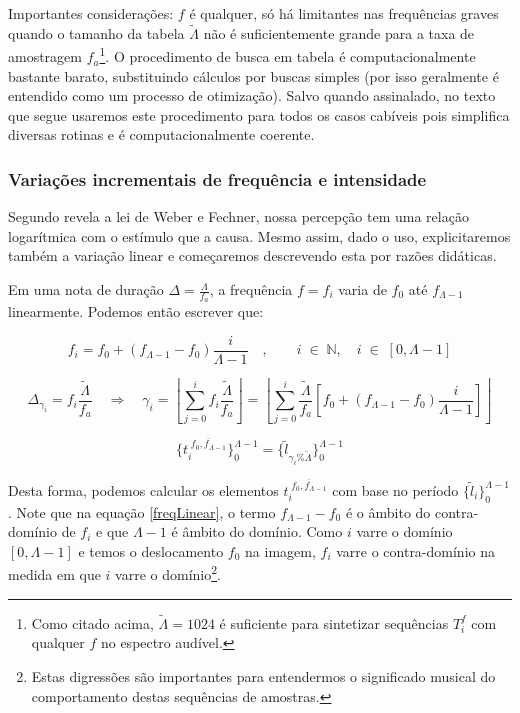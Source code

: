 Importantes considerações: $f$ é qualquer, só há limitantes nas frequências
graves quando o tamanho da tabela $\widetilde{\Lambda}$ não é suficientemente grande para a taxa de amostragem
$f_a$\footnote{Como citado acima, $\widetilde{\Lambda} = 1024$ é suficiente para sintetizar
sequências $T_i^f$ com qualquer $f$ no espectro audível.}. O procedimento de busca em tabela
é computacionalmente bastante barato, substituindo cálculos por buscas simples (por isso geralmente
é entendido como um processo de otimização). Salvo quando assinalado,
no texto que segue usaremos este procedimento para todos os casos cabíveis pois
simplifica diversas rotinas e é computacionalmente coerente.


\subsubsection{Variações incrementais de frequência e intensidade}

Segundo revela a lei de Weber e Fechner, nossa percepção tem uma relação logarítmica com
o estímulo que a causa. Mesmo assim, dado o uso, explicitaremos também a variação
linear e começaremos descrevendo esta por razões didáticas.

Em uma nota de duração $\Delta = \frac{\Lambda}{f_a}$, a frequência $f=f_i$ varia de $f_0$ até $f_{\Lambda -1}$
linearmente. Podemos então escrever que:

\begin{equation}\label{freqLinear}
f_i=f_0 + (f_{\Lambda-1}-f_0)\frac{i}{\Lambda-1} \quad ,\quad \quad i \;\in\; \mathbb{N}, \quad i \;\in\; [0,\Lambda-1]
\end{equation}

\begin{equation}\label{indiceLinear}
\Delta_{\gamma_i}=f_i\frac{\widetilde{\Lambda}}{f_a} \quad \Rightarrow \quad \gamma_i=\left \lfloor \sum_{j=0}^{i} f_i\frac{\widetilde{\Lambda}}{f_a} \right \rfloor   =\left \lfloor \sum_{j=0}^{i}  \frac{\widetilde{\Lambda}}{f_a} \left [f_0 + (f_{\Lambda-1}-f_0)\frac{i}{\Lambda-1} \right ] \right \rfloor 
\end{equation}

\begin{equation}\label{serieAmostralLin}
\{t_i^{\;\overline{f_0,f_{\Lambda-1}}}\}_0^{\Lambda-1}=\{\widetilde{l}_{\gamma_i \% \widetilde{\Lambda}}\}_0^{\Lambda-1}
\end{equation}

Desta forma, podemos calcular os elementos $t_i^{\;\overline{f_0,f_{\Lambda-1}}}$
com base no período $\{\widetilde{l}_i\}_0^{\Lambda-1}$. Note que na equação
\ref{freqLinear}, o termo $f_{\Lambda -1} - f_0$ é o âmbito do contra-domínio de $f_i$
e que $\Lambda -1$ é âmbito do domínio. Como $i$ varre o domínio $[0,\Lambda-1]$ e
temos o deslocamento $f_0$ na imagem, $f_i$ varre o contra-domínio 
na medida em que $i$ varre o domínio\footnote{Estas digressões são importantes
para entendermos o significado musical do comportamento destas sequências de amostras.}.


